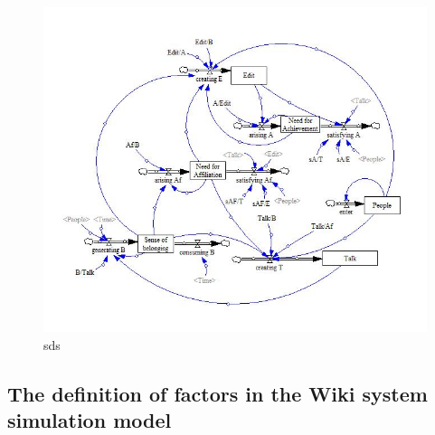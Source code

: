 \documentclass{elsarticle}
\begin{document}
\begin{figure}[htpb]
  \centering
\includegraphics{05}
  \caption{sds}
\end{figure}
\subsection{The definition of factors in the Wiki system simulation model
}
\label{sec:defin-fact-wiki}
\end{document}
